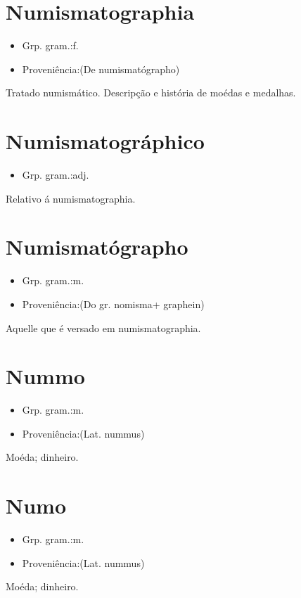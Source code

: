 \section{Numismatographia}
\begin{itemize}
\item {Grp. gram.:f.}
\end{itemize}
\begin{itemize}
\item {Proveniência:(De \textunderscore numismatógrapho\textunderscore )}
\end{itemize}
Tratado numismático.
Descripção e história de moédas e medalhas.
\section{Numismatográphico}
\begin{itemize}
\item {Grp. gram.:adj.}
\end{itemize}
Relativo á numismatographia.
\section{Numismatógrapho}
\begin{itemize}
\item {Grp. gram.:m.}
\end{itemize}
\begin{itemize}
\item {Proveniência:(Do gr. \textunderscore nomisma\textunderscore  + \textunderscore graphein\textunderscore )}
\end{itemize}
Aquelle que é versado em numismatographia.
\section{Nummo}
\begin{itemize}
\item {Grp. gram.:m.}
\end{itemize}
\begin{itemize}
\item {Proveniência:(Lat. \textunderscore nummus\textunderscore )}
\end{itemize}
Moéda; dinheiro.
\section{Numo}
\begin{itemize}
\item {Grp. gram.:m.}
\end{itemize}
\begin{itemize}
\item {Proveniência:(Lat. \textunderscore nummus\textunderscore )}
\end{itemize}
Moéda; dinheiro.
